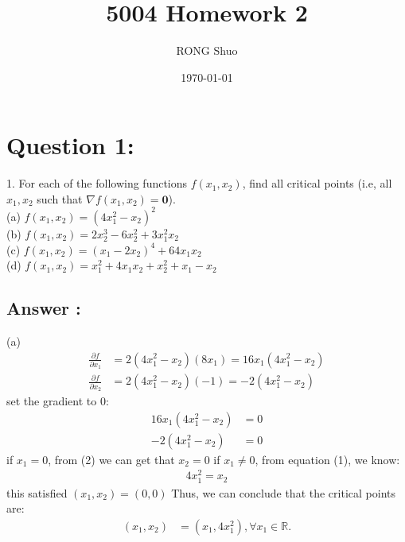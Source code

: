 \documentclass[a4paper,12pt]{article}
\newcommand{\R}{\mathbb{R}}
\begin{document}
\title{5004 Homework 2}
\author{RONG Shuo}
\date{\today}
\maketitle


\section*{Question 1:}
1. For each of the following functions \(f(x_1, x_2)\), find all critical points (i.e, all \(x_1, x_2\) such that \( \nabla f(x_1, x_2) = \bm{0}\)). \\

(a) \(f(x_1, x_2) = (4x_1^2 - x_2)^2\) \\
(b) \( f(x_1, x_2) = 2x_2^3 - 6x_2^2 + 3x_1^2x_2\) \\
(c) \(f(x_1, x_2) = (x_1 - 2x_2)^4 + 64x_1x_2\) \\
(d) \(f(x_1, x_2) = x_1^2 + 4x_1x_2 + x_2^2 + x_1 - x_2\) \\

\subsection*{Answer :}
(a)
\begin{align*}
    \frac{\partial f}{ \partial x_1} &= 2(4x_1^2 - x_2)(8x_1) = 16x_1(4x_1^2 - x_2) \\
    \frac{\partial f}{ \partial x_2} &= 2(4x_1^2 - x_2)(-1) = -2(4x_1^2 - x_2)
\end{align*}
set the gradient to 0:
\begin{align}
    16x_1(4x_1^2 - x_2) &= 0 \\
    -2(4x_1^2 - x_2) &= 0 
\end{align}
if \(x_1 = 0\), from (2) we can get that \(x_2 = 0\)
if \(x_1 \ne 0\), from equation (1), we know:
\begin{align*}
    4x_1^2 = x_2
\end{align*}
this satisfied \((x_1, x_2) = (0, 0)\)
Thus, we can conclude that the critical points are:
\begin{align*}
    (x_1, x_2) &= (x_1, 4x_1^2) ,\forall x_1 \in \R.
\end{align*}
\end{document}
